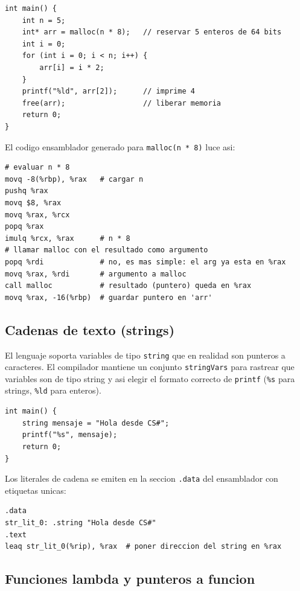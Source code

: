 \documentclass[12pt, a4paper]{article}
\begin{document}
\begin{lstlisting}[style=csstyle, caption={Uso de memoria dinamica en CS\#}]
int main() {
    int n = 5;
    int* arr = malloc(n * 8);   // reservar 5 enteros de 64 bits
    int i = 0;
    for (int i = 0; i < n; i++) {
        arr[i] = i * 2;
    }
    printf("%ld", arr[2]);      // imprime 4
    free(arr);                  // liberar memoria
    return 0;
}
\end{lstlisting}

El codigo ensamblador generado para \texttt{malloc(n * 8)} luce asi:

\begin{lstlisting}[style=asmstyle, caption={Llamada a malloc generada}]
# evaluar n * 8
movq -8(%rbp), %rax   # cargar n
pushq %rax
movq $8, %rax
movq %rax, %rcx
popq %rax
imulq %rcx, %rax      # n * 8
# llamar malloc con el resultado como argumento
popq %rdi             # no, es mas simple: el arg ya esta en %rax
movq %rax, %rdi       # argumento a malloc
call malloc           # resultado (puntero) queda en %rax
movq %rax, -16(%rbp)  # guardar puntero en 'arr'
\end{lstlisting}

\subsection{Cadenas de texto (strings)}

El lenguaje soporta variables de tipo \texttt{string} que en realidad son punteros a caracteres. El compilador mantiene un conjunto \texttt{stringVars} para rastrear que variables son de tipo string y asi elegir el formato correcto de \texttt{printf} (\texttt{\%s} para strings, \texttt{\%ld} para enteros).

\begin{lstlisting}[style=csstyle, caption={Uso de strings en CS\#}]
int main() {
    string mensaje = "Hola desde CS#";
    printf("%s", mensaje);
    return 0;
}
\end{lstlisting}

Los literales de cadena se emiten en la seccion \texttt{.data} del ensamblador con etiquetas unicas:

\begin{lstlisting}[style=asmstyle, caption={Literal de string en el ensamblador generado}]
.data
str_lit_0: .string "Hola desde CS#"
.text
leaq str_lit_0(%rip), %rax  # poner direccion del string en %rax
\end{lstlisting}

\subsection{Funciones lambda y punteros a funcion}
\end{document}
